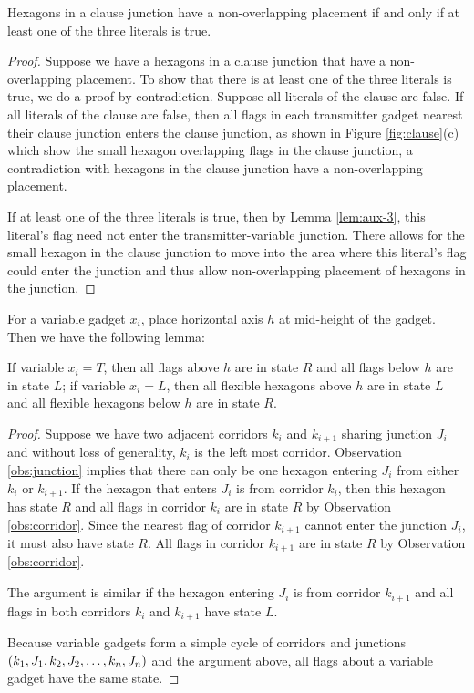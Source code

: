 \begin{lem}\label{lem:aux-1}
Hexagons in a clause junction have a non-overlapping placement if and only if at least one of the three literals is true.
\end{lem}
\begin{proof}
Suppose we have a hexagons in a clause junction that have a non-overlapping placement.
To show that there is at least one of the three literals is true,  we do a proof by contradiction.
Suppose all literals of the clause are false.
If all literals of the clause are false, then all flags in each transmitter gadget nearest their clause junction enters the clause junction, as shown in Figure \ref{fig:clause}(c) which show the small hexagon overlapping flags in the clause junction, a contradiction with hexagons in the clause junction have a non-overlapping placement.

If at least one of the three literals is true, then by Lemma \ref{lem:aux-3}, this literal's flag need not enter the transmitter-variable junction.
There allows for the small hexagon in the clause junction to move into the area where this literal's flag could enter the junction and thus allow non-overlapping placement of hexagons in the junction.
\end{proof}

For a variable gadget $x_i$, place horizontal axis $h$ at mid-height of the gadget.
Then we have the following lemma:
\begin{lem}\label{lem:aux-2}
If variable $x_i = T$, then all flags above $h$ are in state $R$ and all flags below $h$ are in state $L$; if variable $x_i = L$, then all flexible hexagons above $h$ are in state $L$ and all flexible hexagons below $h$ are in state $R$.    
\end{lem}
\begin{proof}
Suppose we have two adjacent corridors $k_i$ and $k_{i+1}$ sharing junction $J_i$ and without loss of generality, $k_i$ is the left most corridor.
Observation \ref{obs:junction} implies that there can only be one hexagon entering $J_i$ from either $k_i$ or $k_{i+1}$. If the hexagon that enters $J_i$ is from corridor $k_i$, then this hexagon has state $R$ and all flags in corridor $k_i$ are in state $R$ by Observation \ref{obs:corridor}. 
Since the nearest flag of corridor $k_{i+1}$ cannot enter the junction $J_i$, it must also have state $R$.  
All flags in corridor $k_{i+1}$ are in state $R$ by Observation \ref{obs:corridor}. 

The argument is similar if the hexagon entering $J_i$ is from corridor $k_{i+1}$ and all flags in both corridors $k_i$ and $k_{i+1}$ have state $L$.

Because variable gadgets form a simple cycle of corridors and junctions $\left( k_1, J_1, k_2, J_2, \dots, k_n, J_n \right)$ and the argument above, all flags about a variable gadget have the same state.
\end{proof}


